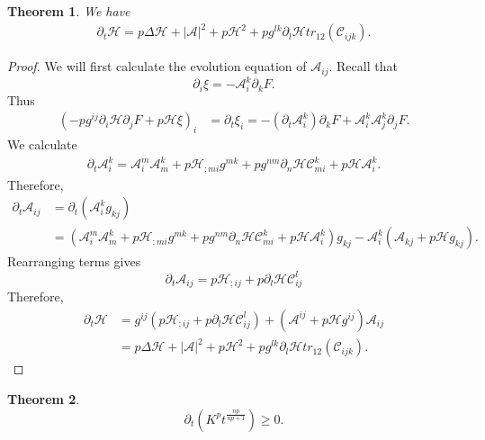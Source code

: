 \documentclass{amsart}
\newtheorem{theorem}{Theorem}
\theoremstyle{definition}
\theoremstyle{remark}
\numberwithin{equation}{section}
\begin{document}
\begin{theorem} We have
\begin{align*}
\partial_t\mathcal{H}= p \Delta \mathcal{H}+|\mathcal{A}|^2+ p  \mathcal{H}^2+ p  g^{lk}\partial_l\mathcal{H} tr_{12}(\mathcal{C}_{ijk}).
\end{align*}
\end{theorem}
\begin{proof}
We will first calculate the evolution equation of $\mathcal{A}_{ij}.$ Recall that $$\partial_i\xi=-\mathcal{A}_i^k\partial_kF.$$ Thus
\begin{align*}
\left(- p  g^{ij}\partial_i\mathcal{H}\partial_jF+ p  \mathcal{H}\xi\right)_i&=\partial_t\xi_i=-(\partial_t\mathcal{A}_i^k)\partial_kF+\mathcal{A}_i^k\mathcal{A}_j^k\partial_jF.
\end{align*}
We calculate
\begin{align*}
\partial_t\mathcal{A}_i^k=\mathcal{A}_i^m\mathcal{A}_m^k+ p  \mathcal{H}_{;mi}g^{mk}+ p
g^{nm}\partial_n \mathcal{H}\mathcal{C}_{mi}^k+ p  \mathcal{H}\mathcal{A}_i^k.
\end{align*}
Therefore,
\begin{align*}
\partial_t\mathcal{A}_{ij}&=\partial_t(\mathcal{A}_i^kg_{kj})\\
&=\left(\mathcal{A}_i^m\mathcal{A}_m^k+ p  \mathcal{H}_{;mi}g^{mk}+ p
g^{nm}\partial_n \mathcal{H}\mathcal{C}_{mi}^k+ p  \mathcal{H}\mathcal{A}_i^k\right)g_{kj}-\mathcal{A}_i^k
(\mathcal{A}_{kj}+ p  \mathcal{H}g_{kj}).
\end{align*}
Rearranging terms gives
\[\partial_t \mathcal{A}_{ij}= p  \mathcal{H}_{;ij}+ p \partial_l\mathcal{H} \mathcal{C}_{ij}^l\]
Therefore,
\begin{align*}
\partial_t\mathcal{H}&=g^{ij}( p  \mathcal{H}_{;ij}+ p  \partial_l \mathcal{H}\mathcal{C}^l_{ij})+(\mathcal{A}^{ij}+ p  \mathcal{H}g^{ij})\mathcal{A}_{ij}\\
&= p \Delta \mathcal{H}+|\mathcal{A}|^2+ p  \mathcal{H}^2+ p  g^{lk}\partial_l\mathcal{H} tr_{12}(\mathcal{C}_{ijk}).
\end{align*}
\end{proof}
\begin{theorem}
\[\partial_t \left(K^{ p }t^{\frac{n p }{n p +1}}\right)\geq 0.\]
\end{theorem}
\end{document}
